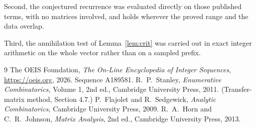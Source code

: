\documentclass[11pt,a4paper]{article}
\theoremstyle{plain}
\theoremstyle{definition}
\begin{document}
Second, the conjectured recurrence was evaluated directly on those published terms, with no
matrices involved, and holds wherever the proved range and the data overlap.

Third, the annihilation test of Lemma~\ref{lem:crit} was carried out in exact integer
arithmetic on the whole vector rather than on a sampled prefix.

\begin{thebibliography}{9}
 The OEIS Foundation, \emph{The On-Line Encyclopedia of Integer
Sequences}, \url{https://oeis.org}, 2026. Sequence A189581.
 R.~P.~Stanley, \emph{Enumerative Combinatorics}, Volume 1, 2nd ed.,
Cambridge University Press, 2011. (Transfer-matrix method, Section 4.7.)
 P.~Flajolet and R.~Sedgewick, \emph{Analytic Combinatorics}, Cambridge
University Press, 2009.
 R.~A.~Horn and C.~R.~Johnson, \emph{Matrix Analysis}, 2nd ed., Cambridge
University Press, 2013.
\end{thebibliography}
\end{document}
